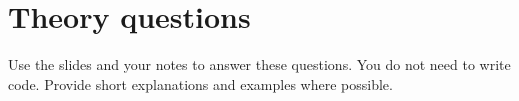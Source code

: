 \documentclass[a4paper]{article}
\begin{document}






% 
% 

%

%

% 
% 
\section{Theory questions}
Use the slides and your notes to answer these questions. You do not need to write code. Provide short explanations and examples where possible.
\end{document}
